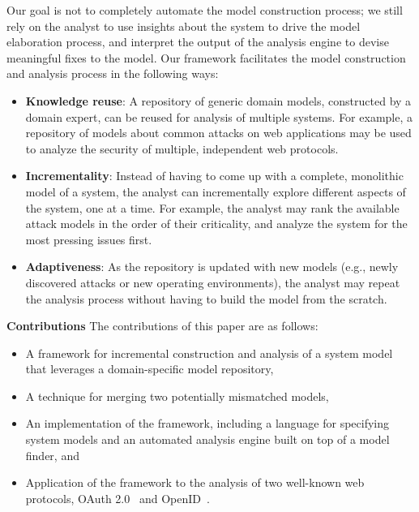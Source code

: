 Our goal is not to completely automate the model construction process;
we still rely on the analyst to use insights about the system to drive
the model elaboration process, and interpret the output of the
analysis engine to devise meaningful fixes to the model. Our framework
facilitates the model construction and analysis process in the
following ways:
\begin{itemize}
\item \textbf{Knowledge reuse}: A repository of generic domain models,
  constructed by a domain expert, can be reused for analysis of
  multiple systems. For example, a repository of models about common
  attacks on web applications may be used to analyze the security of
  multiple, independent web protocols.
\item \textbf{Incrementality}: Instead of having to come up with a
  complete, monolithic model of a system, the analyst can
  incrementally explore different aspects of the system, one at a
  time. For example, the analyst may rank the available attack models
  in the order of their criticality, and analyze the system for the
  most pressing issues first.
\item \textbf{Adaptiveness}: As the repository is updated with new
  models (e.g., newly discovered attacks or new operating environments),
  the analyst may repeat the analysis process without having to build
  the model from the scratch.
\end{itemize}

\textbf{Contributions} The contributions of this paper are as
follows:
\begin{itemize}
\item A framework for incremental construction and analysis of a
  system model that leverages a domain-specific model repository,
\item A technique for merging two potentially mismatched models,
\item An implementation of the framework, including a language for
  specifying system models and an automated analysis engine built on
  top of a model finder, and
\item Application of the framework to the analysis of two well-known
  web protocols, OAuth 2.0~\cite{oauth} and OpenID~\cite{openid}.
\end{itemize}

